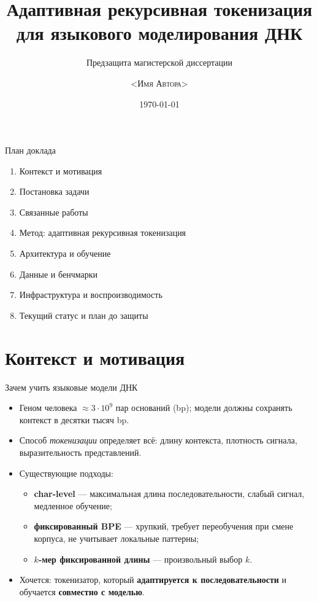 \documentclass[aspectratio=169,xcolor=table]{beamer}
\title{Адаптивная рекурсивная токенизация \\ для языкового моделирования ДНК}
\subtitle{Предзащита магистерской диссертации}
\author{\textsc{<Имя Автора>}}
\institute{\textsc{<Название Университета / Факультета>}}
\date{\today}
\begin{document}
\maketitle

\begin{frame}{План доклада}
  \begin{enumerate}
    \item Контекст и мотивация
    \item Постановка задачи
    \item Связанные работы
    \item Метод: адаптивная рекурсивная токенизация
    \item Архитектура и обучение
    \item Данные и бенчмарки
    \item Инфраструктура и воспроизводимость
    \item Текущий статус и план до защиты
  \end{enumerate}
\end{frame}

\section{Контекст и мотивация}

\begin{frame}{Зачем учить языковые модели ДНК}
  \begin{itemize}
    \item Геном человека $\approx 3 \cdot 10^9$ пар оснований (bp);
          модели должны сохранять контекст в десятки тысяч bp.
    \item Способ \emph{токенизации} определяет всё: длину контекста,
          плотность сигнала, выразительность представлений.
    \item Существующие подходы:
      \begin{itemize}
        \item \textbf{char-level} --- максимальная длина последовательности,
              слабый сигнал, медленное обучение;
        \item \textbf{фиксированный BPE} --- хрупкий, требует переобучения
              при смене корпуса, не учитывает локальные паттерны;
        \item \textbf{$k$-мер фиксированной длины} --- произвольный выбор $k$.
      \end{itemize}
    \item Хочется: токенизатор, который \textbf{адаптируется к
          последовательности} и обучается \textbf{совместно с моделью}.
  \end{itemize}
\end{frame}
\end{document}
